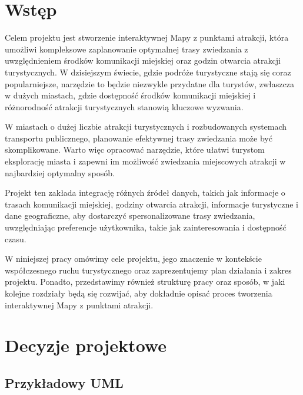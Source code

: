 \documentclass{report}
\begin{document}

	\clearpage
	\chapter{Wstęp}
	\label{ch:wstep}

	Celem projektu jest stworzenie interaktywnej Mapy z punktami atrakcji, która umożliwi kompleksowe zaplanowanie optymalnej trasy zwiedzania z uwzględnieniem środków komunikacji miejskiej oraz godzin otwarcia atrakcji turystycznych. W dzisiejszym świecie, gdzie podróże turystyczne stają się coraz popularniejsze, narzędzie to będzie niezwykle przydatne dla turystów, zwłaszcza w dużych miastach, gdzie dostępność środków komunikacji miejskiej i różnorodność atrakcji turystycznych stanowią kluczowe wyzwania.

	W miastach o dużej liczbie atrakcji turystycznych i rozbudowanych systemach transportu publicznego, planowanie efektywnej trasy zwiedzania może być skomplikowane. Warto więc opracować narzędzie, które ułatwi turystom eksplorację miasta i zapewni im możliwość zwiedzania miejscowych atrakcji w najbardziej optymalny sposób.

	Projekt ten zakłada integrację różnych źródeł danych, takich jak informacje o trasach komunikacji miejskiej, godziny otwarcia atrakcji, informacje turystyczne i dane geograficzne, aby dostarczyć spersonalizowane trasy zwiedzania, uwzględniając preferencje użytkownika, takie jak zainteresowania i dostępność czasu.

	W niniejszej pracy omówimy cele projektu, jego znaczenie w kontekście współczesnego ruchu turystycznego oraz zaprezentujemy plan działania i zakres projektu. Ponadto, przedstawimy również strukturę pracy oraz sposób, w jaki kolejne rozdziały będą się rozwijać, aby dokładnie opisać proces tworzenia interaktywnej Mapy z punktami atrakcji.

	\chapter{Decyzje projektowe}
	\label{ch:decyzje-projektowe}
	

	\section{Przykładowy UML}
	\label {sec:przykadowy-uml}
\end{document}
